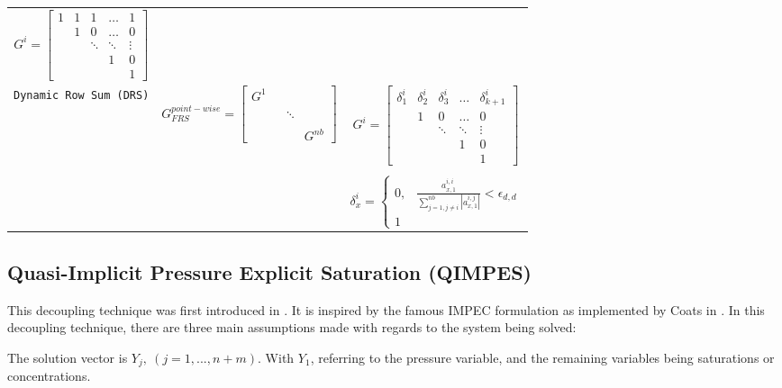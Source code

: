 \begin{table}[h!]
\begin{tabularx}{\linewidth}{c||l||c}
$G^{i} = \begin{bmatrix}
1 & 1 & 1 & \dots & 1 \\
 & 1 & 0 & \dots & 0 \\
 &  & \ddots & \ddots & \vdots \\
 &  &  & 1 & 0 \\
 &  &  &  & 1 
\end{bmatrix} $\\
    \addlinespace
	\texttt{Dynamic Row Sum (DRS)} & $G^{point-wise}_{FRS} = \begin{bmatrix} G^{1} & & &\\ & & & \\ & & \ddots & \\ & & & \\ & & & G^{nb}\end{bmatrix}$&
$G^{i} = \begin{bmatrix}
	\delta_{1}^{i} &\delta_{2}^{i}&\delta_{3}^{i}& \dots &\delta_{k+1}^{i} \\
 & 1 & 0 & \dots & 0 \\
 &  & \ddots & \ddots & \vdots \\
 &  &  & 1 & 0 \\
 &  &  &  & 1 
\end{bmatrix} $\\
	&&\\
	&&
$\delta_{x}^{i} = \begin{cases} 
0, & \frac{a_{x,1}^{i,i}}{\sum_{j=1,j\neq i}^{nb} |a_{x,1}^{i,j}|} < \epsilon_{d,d} \\  
1 & 
     \end{cases} $\\
    \bottomrule
\end{tabularx}
\end{table}

\subsection{Quasi-Implicit Pressure Explicit Saturation (QIMPES)}
This decoupling technique was first introduced in \cite{IPARSdecoupling}. It is inspired by the famous IMPEC formulation as implemented by Coats in \cite{impescoats}.
In this decoupling technique, there are three main assumptions made with regards to the system being solved:
\begin{assumption}
	The solution vector is ${Y_{j}}, \ (j=1,...,n+m)$. With $Y_{1}$, referring to the pressure variable, and the remaining variables being
	saturations or concentrations.
\end{assumption}

